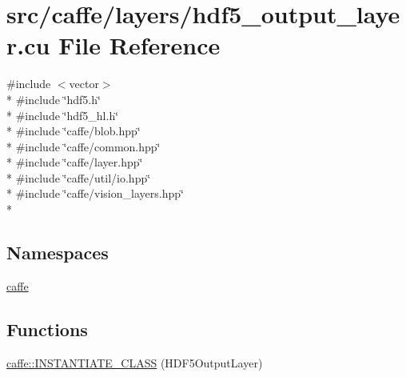 \hypertarget{hdf5__output__layer_8cu}{\section{src/caffe/layers/hdf5\+\_\+output\+\_\+layer.cu File Reference}
\label{hdf5__output__layer_8cu}
}
{\ttfamily \#include $<$vector$>$}\\*
{\ttfamily \#include \char`\"{}hdf5.\+h\char`\"{}}\\*
{\ttfamily \#include \char`\"{}hdf5\+\_\+hl.\+h\char`\"{}}\\*
{\ttfamily \#include \char`\"{}caffe/blob.\+hpp\char`\"{}}\\*
{\ttfamily \#include \char`\"{}caffe/common.\+hpp\char`\"{}}\\*
{\ttfamily \#include \char`\"{}caffe/layer.\+hpp\char`\"{}}\\*
{\ttfamily \#include \char`\"{}caffe/util/io.\+hpp\char`\"{}}\\*
{\ttfamily \#include \char`\"{}caffe/vision\+\_\+layers.\+hpp\char`\"{}}\\*
\subsection*{Namespaces}
\begin{DoxyCompactItemize}
\item 
 \hyperlink{namespacecaffe}{caffe}
\end{DoxyCompactItemize}
\subsection*{Functions}
\begin{DoxyCompactItemize}
\item 
\hyperlink{namespacecaffe_a9c470a1804e112ffc6b67533c501a908}{caffe\+::\+I\+N\+S\+T\+A\+N\+T\+I\+A\+T\+E\+\_\+\+C\+L\+A\+S\+S} (H\+D\+F5\+Output\+Layer)
\end{DoxyCompactItemize}
